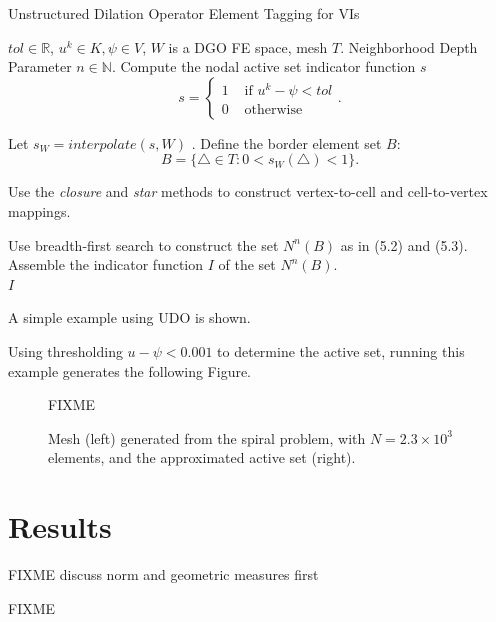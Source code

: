 \documentclass[]{interact}
\theoremstyle{plain}%
\theoremstyle{definition}
\theoremstyle{remark}
\begin{document}
\begin{algorithm}[H]
  \caption{Unstructured Dilation Operator Element Tagging for VIs}
  \begin{algorithmic}[1]
    \Require $tol \in \mathbb{R}$, $u^k \in K, \psi \in V$, $W$ is a DGO FE space, mesh $T$.
    \Require Neighborhood Depth Parameter $n \in \mathbb{N}$.
    \State Compute the nodal active set indicator function $s$
    \begin{equation}
    s = \begin{cases}
      1 & \text{ if } u^k - \psi < tol\\
      0 & \text{ otherwise}
    \end{cases}.
    \end{equation}
  
    \State Let $s_W = interpolate(s, W)$ .
    \State Define the border element set $B$:
    \begin{equation}
    B = \{\triangle \in T: 0 < s_W(\triangle) < 1 \} .
    \end{equation}

    \State Use the \emph{closure} and \emph{star} methods to construct vertex-to-cell and cell-to-vertex mappings.

    \State Use breadth-first search to construct the set $N^n(B)$ as in (5.2) and (5.3). 
    \State Assemble the indicator function $I$ of the set $N^n(B)$. \\
    \Return $I$
  \end{algorithmic}
  \end{algorithm}

A simple example using UDO is shown.


Using thresholding $u - \psi < 0.001$ to determine the active set, running this example generates the following Figure.

\begin{figure}[H]
FIXME
\caption{Mesh (left) generated from the spiral problem, with $N=2.3\times 10^3$ elements, and the approximated active set (right).}
\end{figure}


\section{Results} \label{sec:results}

FIXME discuss norm and geometric measures first

FIXME \cite{Kosub2016} \cite{JungeblutKleistMiltzow2022}
\end{document}
